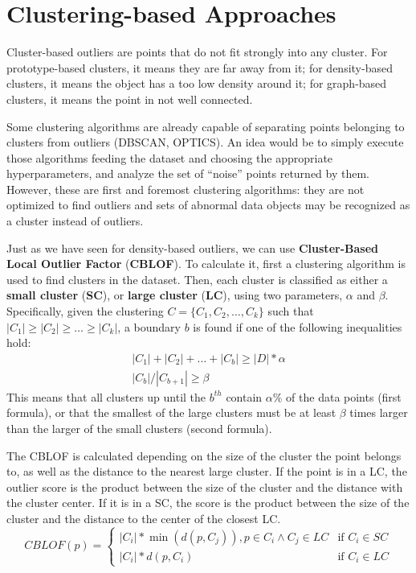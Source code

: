 \section{Clustering-based Approaches}

Cluster-based outliers are points that do not fit strongly into any cluster. For prototype-based clusters, it means they are far away from it; for density-based clusters, it means the object has a too low density around it; for graph-based clusters, it means the point in not well connected.

Some clustering algorithms are already capable of separating points belonging to clusters from outliers (DBSCAN, OPTICS). An idea would be to simply execute those algorithms feeding the dataset and choosing the appropriate hyperparameters, and analyze the set of ``noise'' points returned by them. However, these are first and foremost clustering algorithms: they are not optimized to find outliers and sets of abnormal data objects may be recognized as a cluster instead of outliers.

Just as we have seen for density-based outliers, we can use \textbf{Cluster-Based Local Outlier Factor} (\textbf{CBLOF}). To calculate it, first a clustering algorithm is used to find clusters in the dataset. Then, each cluster is classified as either a \textbf{small cluster} (\textbf{SC}), or \textbf{large cluster} (\textbf{LC}), using two parameters, $\alpha$ and $\beta$. Specifically, given the clustering $C = \{C_1, C_2, \dots, C_k \}$ such that $|C_1| \geq |C_2| \geq \dots \geq |C_k|$, a boundary $b$ is found if one of the following inequalities hold:
\begin{gather*}
    |C_1| + |C_2| + \dots + |C_b| \geq |D|*\alpha \\
    |C_b|/|C_{b+1}| \geq \beta
\end{gather*}
This means that all clusters up until the $b^{th}$ contain $\alpha \%$ of the data points (first formula), or that the smallest of the large clusters must be at least $\beta$ times larger than the larger of the small clusters (second formula). 

The CBLOF is calculated depending on the size of the cluster the point belongs to, as well as the distance to the nearest large cluster. If the point is in a LC, the outlier score is the product between the size of the cluster and the distance with the cluster center. If it is in a SC, the score is the product between the size of the cluster and the distance to the center of the closest LC.
\begin{equation*}
    CBLOF(p) = \begin{cases}
        |C_i|*\min(d(p, C_j)), p \in C_i \land C_j \in LC & \text{if $C_i \in SC$} \\
        |C_i|*d(p, C_i) & \text{if $C_i \in LC$}
    \end{cases}
\end{equation*}

